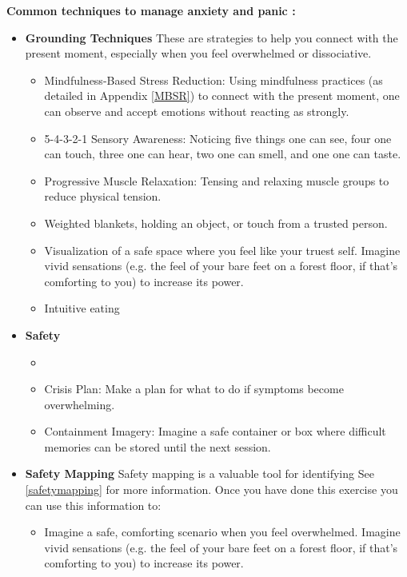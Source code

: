 \documentclass[12pt,letterpaper]{book}
\begin{document}
\noindent \textbf{Common techniques to manage anxiety and panic \cite{vanderKolkBody,williamsWorkbook}:}
\begin{itemize}
    \item \textbf{Grounding Techniques} These are strategies to help you connect with the present moment, especially when you feel overwhelmed or dissociative.
    \begin{itemize}
        \item Mindfulness-Based Stress Reduction: Using mindfulness practices (as detailed in Appendix \ref{MBSR}) to connect with the present moment, one can observe and accept emotions without reacting as strongly.
        \item 5-4-3-2-1 Sensory Awareness: Noticing five things one can see, four one can touch, three one can hear, two one can smell, and one one can taste.
        \item Progressive Muscle Relaxation: Tensing and relaxing muscle groups to reduce physical tension.
        \item Weighted blankets, holding an object, or touch from a trusted person.
        \item Visualization of a safe space where you feel like your truest self. Imagine vivid sensations (e.g. the feel of your bare feet on a forest floor, if that's comforting to you) to increase its power.
        \item Intuitive eating
    \end{itemize}
    \item \textbf{Safety}
    \begin{itemize}
        \item {}
        \item Crisis Plan: Make a plan for what to do if symptoms become overwhelming. 
        \item Containment Imagery: Imagine a safe container or box where difficult memories can be stored until the next session.
    \end{itemize}
    \item \textbf{Safety Mapping} Safety mapping is a valuable tool for identifying See \ref{safetymapping} for more information. Once you have done this exercise you can use this information to:
    \begin{itemize}
        \item Imagine a safe, comforting scenario when you feel overwhelmed. Imagine vivid sensations (e.g. the feel of your bare feet on a forest floor, if that's comforting to you) to increase its power.

\end{itemize}
\end{itemize}
\end{document}
